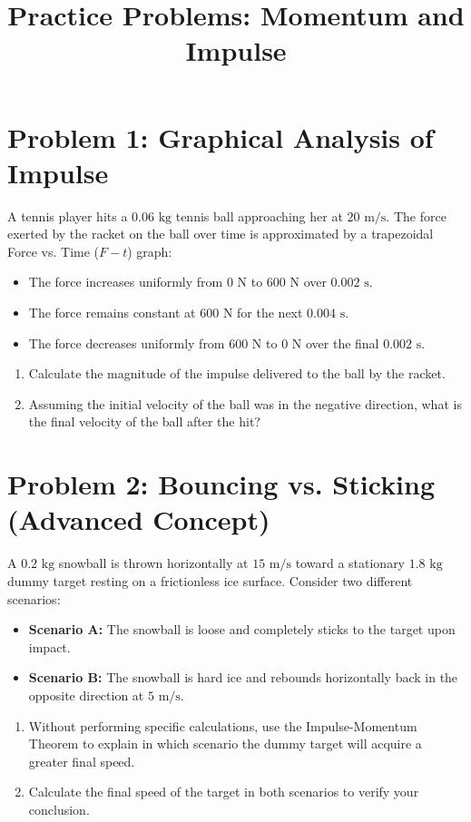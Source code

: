 \documentclass{article}
\begin{document}
\title{Practice Problems: Momentum and Impulse}
\author{}
\date{}
\maketitle

\section*{Problem 1: Graphical Analysis of Impulse}
A tennis player hits a $0.06 \text{ kg}$ tennis ball approaching her at $20 \text{ m/s}$. The force exerted by the racket on the ball over time is approximated by a trapezoidal Force vs. Time ($F-t$) graph:
\begin{itemize}
    \item The force increases uniformly from $0 \text{ N}$ to $600 \text{ N}$ over $0.002 \text{ s}$.
    \item The force remains constant at $600 \text{ N}$ for the next $0.004 \text{ s}$.
    \item The force decreases uniformly from $600 \text{ N}$ to $0 \text{ N}$ over the final $0.002 \text{ s}$.
\end{itemize}
\begin{enumerate}[label=(\alph*)]
    \item Calculate the magnitude of the impulse delivered to the ball by the racket.
    \item Assuming the initial velocity of the ball was in the negative direction, what is the final velocity of the ball after the hit?
\end{enumerate}

\newpage

\section*{Problem 2: Bouncing vs. Sticking (Advanced Concept)}
A $0.2 \text{ kg}$ snowball is thrown horizontally at $15 \text{ m/s}$ toward a stationary $1.8 \text{ kg}$ dummy target resting on a frictionless ice surface. Consider two different scenarios:
\begin{itemize}
    \item \textbf{Scenario A:} The snowball is loose and completely sticks to the target upon impact.
    \item \textbf{Scenario B:} The snowball is hard ice and rebounds horizontally back in the opposite direction at $5 \text{ m/s}$.
\end{itemize}
\begin{enumerate}[label=(\alph*)]
    \item Without performing specific calculations, use the Impulse-Momentum Theorem to explain in which scenario the dummy target will acquire a greater final speed.
    \item Calculate the final speed of the target in both scenarios to verify your conclusion.
\end{enumerate}
\end{document}
